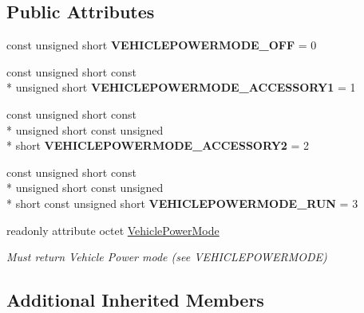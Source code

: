 \subsection*{Public Attributes}
\begin{DoxyCompactItemize}
\item 
\hypertarget{interfaceVehicle_1_1VehiclePowerMode_a4bda2e40129a00ce50b4cca14388417f}{const unsigned short {\bfseries V\-E\-H\-I\-C\-L\-E\-P\-O\-W\-E\-R\-M\-O\-D\-E\-\_\-\-O\-F\-F} = 0}\label{interfaceVehicle_1_1VehiclePowerMode_a4bda2e40129a00ce50b4cca14388417f}

\item 
\hypertarget{interfaceVehicle_1_1VehiclePowerMode_ab07954f297aabf3271b3009b5ab0857b}{const unsigned short const \\*
unsigned short {\bfseries V\-E\-H\-I\-C\-L\-E\-P\-O\-W\-E\-R\-M\-O\-D\-E\-\_\-\-A\-C\-C\-E\-S\-S\-O\-R\-Y1} = 1}\label{interfaceVehicle_1_1VehiclePowerMode_ab07954f297aabf3271b3009b5ab0857b}

\item 
\hypertarget{interfaceVehicle_1_1VehiclePowerMode_a532226555023d30403c604534fcb464a}{const unsigned short const \\*
unsigned short const unsigned \\*
short {\bfseries V\-E\-H\-I\-C\-L\-E\-P\-O\-W\-E\-R\-M\-O\-D\-E\-\_\-\-A\-C\-C\-E\-S\-S\-O\-R\-Y2} = 2}\label{interfaceVehicle_1_1VehiclePowerMode_a532226555023d30403c604534fcb464a}

\item 
\hypertarget{interfaceVehicle_1_1VehiclePowerMode_a06596b54223591cfe9b310247e606ac6}{const unsigned short const \\*
unsigned short const unsigned \\*
short const unsigned short {\bfseries V\-E\-H\-I\-C\-L\-E\-P\-O\-W\-E\-R\-M\-O\-D\-E\-\_\-\-R\-U\-N} = 3}\label{interfaceVehicle_1_1VehiclePowerMode_a06596b54223591cfe9b310247e606ac6}

\item 
readonly attribute octet \hyperlink{interfaceVehicle_1_1VehiclePowerMode_aa3dc35878424b72e9a252277bc9b1fb9}{Vehicle\-Power\-Mode}
\begin{DoxyCompactList}\small\item\em Must return Vehicle Power mode (see V\-E\-H\-I\-C\-L\-E\-P\-O\-W\-E\-R\-M\-O\-D\-E) \end{DoxyCompactList}\end{DoxyCompactItemize}
\subsection*{Additional Inherited Members}


